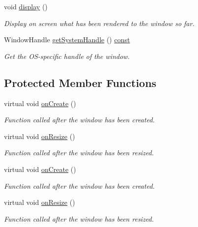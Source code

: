 \begin{DoxyCompactItemize}
void \hyperlink{classsf_1_1_window_adabf839cb103ac96cfc82f781638772a}{display} ()
\begin{DoxyCompactList}\small\item\em Display on screen what has been rendered to the window so far. \end{DoxyCompactList}\item 
Window\-Handle \hyperlink{classsf_1_1_window_a26368e7162229f8637c34d80ab0f138e}{get\-System\-Handle} () \hyperlink{term__entry_8h_a57bd63ce7f9a353488880e3de6692d5a}{const} 
\begin{DoxyCompactList}\small\item\em Get the O\-S-\/specific handle of the window. \end{DoxyCompactList}\end{DoxyCompactItemize}
\subsection*{Protected Member Functions}
\begin{DoxyCompactItemize}
\item 
virtual void \hyperlink{classsf_1_1_window_a106633b9be49b27f83d4712689b493eb}{on\-Create} ()
\begin{DoxyCompactList}\small\item\em Function called after the window has been created. \end{DoxyCompactList}\item 
virtual void \hyperlink{classsf_1_1_window_a10f567a387da7b49f417f73321fcf64d}{on\-Resize} ()
\begin{DoxyCompactList}\small\item\em Function called after the window has been resized. \end{DoxyCompactList}\item 
virtual void \hyperlink{classsf_1_1_window_a106633b9be49b27f83d4712689b493eb}{on\-Create} ()
\begin{DoxyCompactList}\small\item\em Function called after the window has been created. \end{DoxyCompactList}\item 
virtual void \hyperlink{classsf_1_1_window_a10f567a387da7b49f417f73321fcf64d}{on\-Resize} ()
\begin{DoxyCompactList}\small\item\em Function called after the window has been resized. \end{DoxyCompactList}\end{DoxyCompactItemize}


